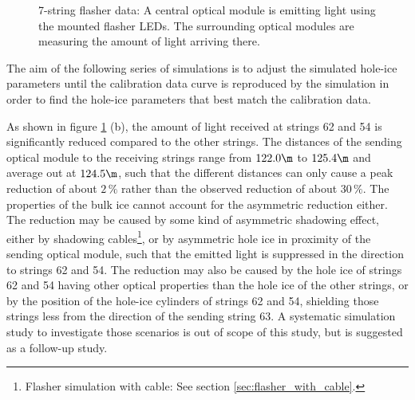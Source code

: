 \begin{figure}[htbp]
  \hfill
  \caption{7-string flasher data: A central optical module is emitting light using the mounted flasher LEDs. The surrounding optical modules are measuring the amount of light arriving there.}
  \label{fig:ea9Zieh0}
\end{figure}

The aim of the following series of simulations is to adjust the simulated hole-ice parameters until the calibration data curve is reproduced by the simulation in order to find the hole-ice parameters that best match the calibration data.



As shown in figure \ref{fig:ea9Zieh0} (b), the amount of light received at strings 62 and 54 is significantly reduced compared to the other strings. The distances of the sending optical module to the receiving strings range from $122.0\m$ to $125.4\m$ and average out at $124.5\m$, such that the different distances can only cause a peak reduction of about $2\,\%$ rather than the observed reduction of about $30\,\%$.
The properties of the bulk ice cannot account for the asymmetric reduction either.
The reduction may be caused by some kind of asymmetric shadowing effect, either by shadowing cables\footnote{Flasher simulation with cable: See section \ref{sec:flasher_with_cable}.}, or by asymmetric hole ice in proximity of the sending optical module, such that the emitted light is suppressed in the direction to strings 62 and 54. The reduction may also be caused by the hole ice of strings 62 and 54 having other optical properties than the hole ice of the other strings, or by the position of the hole-ice cylinders of strings 62 and 54, shielding those strings less from the direction of the sending string 63. A systematic simulation study to investigate those scenarios is out of scope of this study, but is suggested as a follow-up study.\followup

